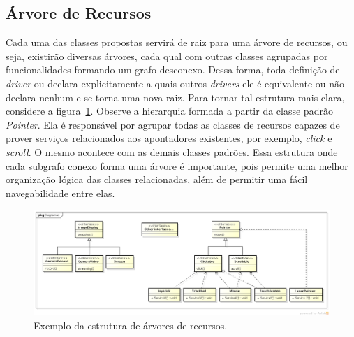 \subsection{Árvore de Recursos}

Cada uma das classes propostas servirá de raiz para uma árvore de recursos, ou seja, existirão diversas árvores, cada qual com outras classes agrupadas por funcionalidades formando um grafo desconexo. Dessa forma, toda definição de \emph{driver} ou declara explicitamente a quais outros \emph{drivers} ele é equivalente ou não declara nenhum e se torna uma nova raiz. Para tornar tal estrutura mais clara, considere a figura~\ref{fig:arvoreDeRecursos}. Observe a hierarquia formada a partir da classe padrão \emph{Pointer}. Ela é responsável por agrupar todas as classes de recursos capazes de prover serviços relacionados aos apontadores existentes, por exemplo, \emph{click} e \emph{scroll}. O mesmo acontece com as demais classes padrões. Essa estrutura onde cada subgrafo conexo forma uma árvore é importante, pois permite uma melhor organização lógica das classes relacionadas, além de permitir uma fácil navegabilidade entre elas.

\begin{figure}[ht]
	\center
	\includegraphics[scale=0.35]{imagens/hierarquiaDeRecursos}
	\caption{Exemplo da estrutura de árvores de recursos.}
	\label{fig:arvoreDeRecursos}
\end{figure}

